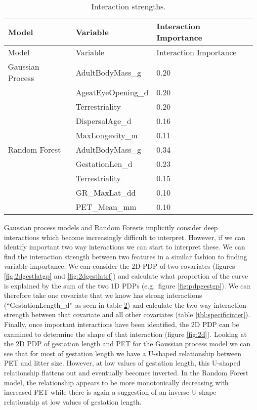 \documentclass[12pt,]{article}
\begin{document}
\begin{table}[t!]
\begin{longtable}[c]{@{}lll@{}}
\caption{Interaction strengths. \label{tbl:interimp}}\tabularnewline
\toprule
Model & Variable & Interaction Importance\tabularnewline
\midrule
\endfirsthead
\toprule
Model & Variable & Interaction Importance\tabularnewline
\midrule
\endhead
Gaussian Process & AdultBodyMass\_g & 0.20\tabularnewline
& AgeatEyeOpening\_d & 0.20\tabularnewline
& Terrestriality & 0.20\tabularnewline
& DispersalAge\_d & 0.16\tabularnewline
& MaxLongevity\_m & 0.11\tabularnewline
Random Forest & AdultBodyMass\_g & 0.34\tabularnewline
& GestationLen\_d & 0.23\tabularnewline
& Terrestriality & 0.15\tabularnewline
& GR\_MaxLat\_dd & 0.10\tabularnewline
& PET\_Mean\_mm & 0.10\tabularnewline
\bottomrule
\end{longtable}
\end{table}


Gaussian process models and Random Forests implicitly consider deep interactions which become increasingly difficult to interpret.
However, if we can identify important two way interactions we can start to interpret these.
We can find the interaction strength between two features in a similar fashion to finding variable importance.
We can consider the 2D PDP of two covariates (figures \ref{fig:2dgestlatgp} and  \ref{fig:2dgestlatrf}) and calculate what proportion of the curve is explained by the sum of the two 1D PDPs (e.g.~figure \ref{fig:pdpgestgp}).
We can therefore take one covariate that we know has strong interactions (``GestationLength\_d'' as seen in table \ref{tbl:interimp}) and calculate the two-way interaction strength between that covariate and all other covariates (table \ref{tbl:specificinter}).
Finally, once important interactions have been identified, the 2D PDP can be examined to determine the shape of that interaction (figure \ref{fig:2d}).
Looking at the 2D PDP of gestation length and PET for the Gaussian process model we can see that for most of gestation length we have a U-shaped relationship between PET and litter size.
However, at low values of gestation length, this U-shaped relationship flattens out and eventually becomes inverted.
In the Random Forest model, the relationship appears to be more monotonically decreasing with increased PET while there is again a suggestion of an inverse U-shape relationship at low values of gestation length.
\end{document}
